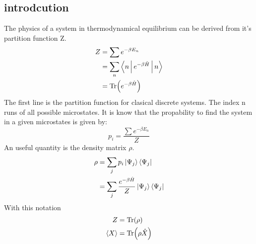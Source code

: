 \subsection{introdcution}


The physics of a system in thermodynamical equilibrium can be derived from it's partition function Z.
\begin{equation}
    \begin{split}
        Z &= \sum e^{ - \beta E_n} \\
        &= \sum_n \Braket{n | e^{ - \beta \hat{H} }  | n} \\
        &= \Tr( e^{ - \beta \hat{H} } )
    \end{split}
\end{equation}
The first line is the partition function for clasical discrete systems. The index n runs of all possible microstates. It is know that the propability to find the system in a given microstates is given by:
\begin{equation}
    p_i = \frac{\sum e^{ - \beta E_n}}{Z}
\end{equation}
An useful quantity is the density matrix $\rho$.
\begin{equation}
    \begin{split}
        \rho &= \sum_j p_i  \Ket{ \Psi_j} \Bra{\Psi_j}   \\
        &= \sum_j \frac{ e^{ - \beta \hat{H} } }{Z}  \Ket{ \Psi_j} \Bra{\Psi_j}
    \end{split}
\end{equation}
With this notation
\begin{equation}
    \begin{split}
        Z &= \Tr( \rho) \\
        \Braket{X} &= \Tr(\rho \hat{X})
    \end{split}
\end{equation}
